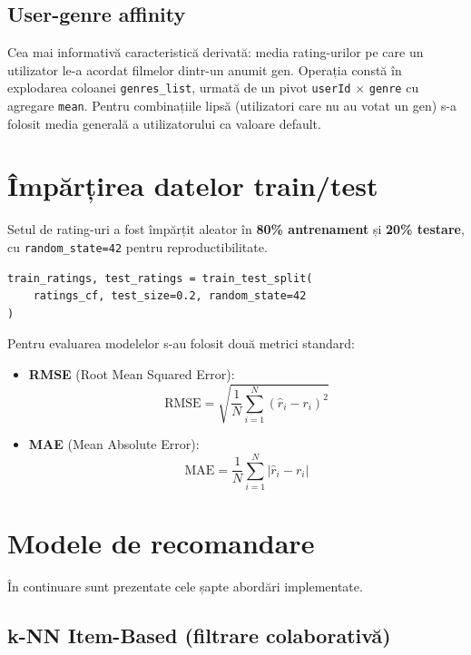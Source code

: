\documentclass[12pt,a4paper]{article}
\begin{document}
\subsection{User-genre affinity}

Cea mai informativă caracteristică derivată: media rating-urilor pe care un utilizator le-a acordat filmelor dintr-un anumit gen. Operația constă în explodarea coloanei \texttt{genres\_list}, urmată de un pivot \texttt{userId} $\times$ \texttt{genre} cu agregare \texttt{mean}. Pentru combinațiile lipsă (utilizatori care nu au votat un gen) s-a folosit media generală a utilizatorului ca valoare default.

\section{Împărțirea datelor train/test}

Setul de rating-uri a fost împărțit aleator în \textbf{80\% antrenament} și \textbf{20\% testare}, cu \texttt{random\_state=42} pentru reproductibilitate.

\begin{lstlisting}
train_ratings, test_ratings = train_test_split(
    ratings_cf, test_size=0.2, random_state=42
)
\end{lstlisting}

Pentru evaluarea modelelor s-au folosit două metrici standard:
\begin{itemize}[noitemsep]
    \item \textbf{RMSE} (Root Mean Squared Error):
    $$\text{RMSE} = \sqrt{\frac{1}{N}\sum_{i=1}^{N}(\hat{r}_i - r_i)^2}$$
    \item \textbf{MAE} (Mean Absolute Error):
    $$\text{MAE} = \frac{1}{N}\sum_{i=1}^{N}|\hat{r}_i - r_i|$$
\end{itemize}

\section{Modele de recomandare}

În continuare sunt prezentate cele șapte abordări implementate.

\subsection{k-NN Item-Based (filtrare colaborativă)}
\end{document}
